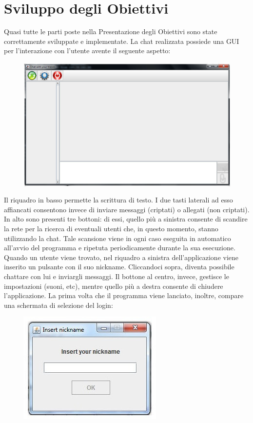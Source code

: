 \section{Sviluppo degli Obiettivi}
Quasi tutte le parti poste nella Presentazione degli Obiettivi sono state correttamente
sviluppate e implementate. La chat realizzata possiede una GUI per l'interazione
con l'utente avente il seguente aspetto:
\newpage
\begin{figure}[h]
\centering
\includegraphics[scale=0.4]{gui1.jpg}
\end{figure}

Il riquadro in basso permette la scrittura di testo.
I due tasti laterali ad esso affiancati
consentono invece di inviare messaggi (criptati) o allegati (non criptati).
In alto sono presenti tre bottoni:
di essi, quello più a sinistra consente di scandire la rete per la ricerca di eventuali 
utenti che, in questo momento, stanno utilizzando la chat.
Tale scansione viene in ogni caso eseguita in automatico all'avvio del programma
e ripetuta periodicamente durante la sua esecuzione.
Quando un utente viene trovato, nel riquadro a sinistra 
dell'applicazione viene inserito un pulsante con il suo nickname.
Cliccandoci sopra, diventa possibile chattare con lui e inviargli messaggi.
Il bottone al centro, invece, gestisce le impostazioni (suoni, etc),
mentre quello più a destra consente di chiudere l'applicazione.
La prima volta che il programma viene lanciato, inoltre,
compare una schermata di selezione del login:
\begin{figure}[h]
\centering
\includegraphics[scale=0.5]{login1.jpg}
\end{figure}

